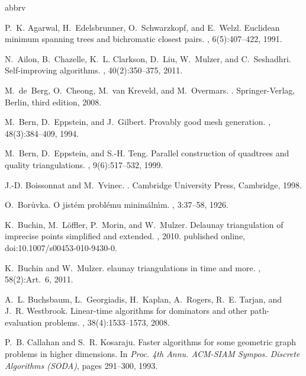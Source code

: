 \documentclass[11pt]{paper}
\begin{document}
 {abbrv}
\newcommand{\SortNoop}[1]{}
\begin{thebibliography}{10}

P.~K. Agarwal, H.~Edelsbrunner, O.~Schwarzkopf, and E.~Welzl.
\newblock Euclidean minimum spanning trees and bichromatic closest pairs.
, 6(5):407--422, 1991.

N.~Ailon, B.~Chazelle, K.~L. Clarkson, D.~Liu, W.~Mulzer, and C.~Seshadhri.
\newblock Self-improving algorithms.
, 40(2):350--375, 2011.

M.~{\SortNoop{Berg}}de~Berg, O.~Cheong, M.~van Kreveld, and M.~Overmars.
.
\newblock Springer-Verlag, Berlin, third edition, 2008.

M.~Bern, D.~Eppstein, and J.~Gilbert.
\newblock Provably good mesh generation.
, 48(3):384--409, 1994.

M.~Bern, D.~Eppstein, and S.-H. Teng.
\newblock Parallel construction of quadtrees and quality triangulations.
, 9(6):517--532, 1999.

J.-D. Boissonnat and M.~Yvinec.
.
\newblock Cambridge University Press, Cambridge, 1998.

O.~Bor\r{u}vka.
\newblock O jist\'em probl\'emu minim\'aln\'{\i}m.
, 3:37--58, 1926.

K.~Buchin, M.~L{\"o}ffler, P.~Morin, and W.~Mulzer.
\newblock Delaunay triangulation of imprecise points simplified and extended.
, 2010.
\newblock published online, doi:10.1007/s00453-010-9430-0.

K.~Buchin and W.~Mulzer.
elaunay triangulations in  time and more.
, 58(2):Art.~6, 2011.

A.~L. Buchsbaum, L.~Georgiadis, H.~Kaplan, A.~Rogers, R.~E. Tarjan, and J.~R.
  Westbrook.
\newblock Linear-time algorithms for dominators and other path-evaluation
  problems.
, 38(4):1533--1573, 2008.

P.~B. Callahan and S.~R. Kosaraju.
\newblock Faster algorithms for some geometric graph problems in higher
  dimensions.
\newblock In {\em Proc. 4th Annu. ACM-SIAM Sympos. Discrete Algorithms (SODA)},
  pages 291--300, 1993.


\end{thebibliography}
\end{document}
